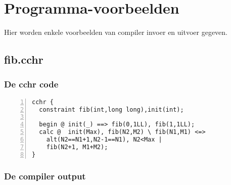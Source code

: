 \chapter{Programma-voorbeelden} \label{chap:output}

Hier worden enkele voorbeelden van compiler invoer en uitvoer gegeven.

\section{fib.cchr} \label{sec:out-fib}

\subsection{De cchr code}

\begin{Verbatim}[frame=single,numbers=left]
cchr {
  constraint fib(int,long long),init(int);

  begin @ init(_) ==> fib(0,1LL), fib(1,1LL);
  calc @  init(Max), fib(N2,M2) \ fib(N1,M1) <=>
    alt(N2==N1+1,N2-1==N1), N2<Max |
    fib(N2+1, M1+M2);
}
\end{Verbatim}

\subsection{De compiler output}

